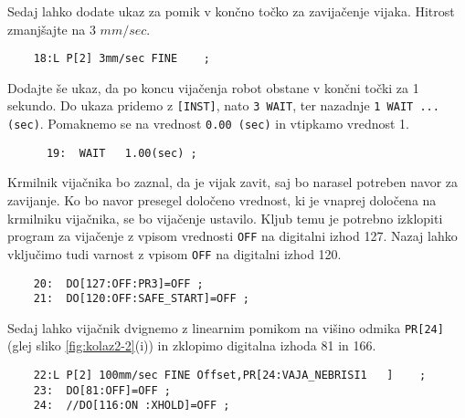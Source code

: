Sedaj lahko dodate ukaz za pomik v končno točko za zavijačenje vijaka. Hitrost zmanjšajte na $3$ $mm/sec$.

\vspace{0.35cm}
\begin{mdframed}[backgroundcolor=orange!20, shadow=true,roundcorner=8pt]
	
	\begin{verbatim}
	18:L P[2] 3mm/sec FINE    ;
	\end{verbatim}
	
\end{mdframed}

Dodajte še ukaz, da po koncu vijačenja robot obstane v končni točki za 1 sekundo. Do ukaza pridemo z \verb|[INST]|, nato \verb*|3 WAIT|, ter nazadnje \verb*|1 WAIT ... (sec)|. Pomaknemo se na vrednost \verb*|0.00 (sec)| in vtipkamo vrednost 1.

\vspace{0.35cm}
\begin{mdframed}[backgroundcolor=orange!20, shadow=true,roundcorner=8pt]
	
	\begin{verbatim}
	  19:  WAIT   1.00(sec) ;
	\end{verbatim}
	
\end{mdframed} 

Krmilnik vijačnika bo zaznal, da je vijak zavit, saj bo narasel potreben navor za zavijanje. Ko bo navor presegel določeno vrednost, ki je vnaprej določena na krmilniku vijačnika, se bo vijačenje ustavilo. Kljub temu je potrebno izklopiti program za vijačenje z vpisom vrednosti \verb*|OFF| na digitalni izhod 127. Nazaj lahko vključimo tudi varnost z vpisom \verb*|OFF| na digitalni izhod 120.

\vspace{0.35cm}
\begin{mdframed}[backgroundcolor=orange!20, shadow=true,roundcorner=8pt]
	
	\begin{verbatim}
	20:  DO[127:OFF:PR3]=OFF ;
	21:  DO[120:OFF:SAFE_START]=OFF ;
	\end{verbatim}
	
\end{mdframed} 

Sedaj lahko vijačnik dvignemo z linearnim pomikom na višino odmika \verb*|PR[24]| (glej sliko \ref{fig:kolaz2-2}(i)) in zklopimo digitalna izhoda 81 in 166.

\vspace{0.35cm}
\begin{mdframed}[backgroundcolor=orange!20, shadow=true,roundcorner=8pt]
	
	\begin{verbatim}
	22:L P[2] 100mm/sec FINE Offset,PR[24:VAJA_NEBRISI1   ]    ;
	23:  DO[81:OFF]=OFF ;
	24:  //DO[116:ON :XHOLD]=OFF ;
	\end{verbatim}
	
\end{mdframed} 

